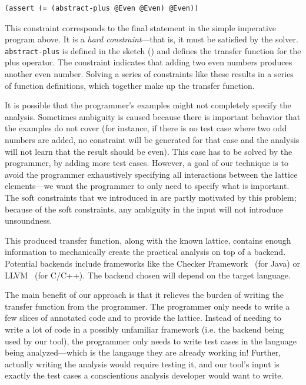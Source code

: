 \documentclass[10pt,conference]{IEEEtran}
\begin{document}
\lstset{language=[]Lisp}
\begin{lstlisting}[columns=fullflexible]
(assert (= (abstract-plus @Even @Even) @Even))
\end{lstlisting}
\lstset{language=C}

This constraint corresponds to the final statement in the
simple imperative program above.
It is a \textit{hard constraint}---that is, it must be satisfied
by the solver.
\lstinline{abstract-plus} is defined in the sketch () and defines
the transfer function for the plus operator.
The constraint indicates that
adding two even numbers produces another even number. Solving a series of
constraints like these
results in a series of function definitions, which together
make up the transfer function.

It is possible that the programmer's
examples might not completely specify the analysis. Sometimes
ambiguity is caused because there is important behavior that the
examples do not cover (for instance, if there is no test case where
two odd numbers are added, no constraint will be generated for that
case and the analysis will not learn that the result should be even).
This case has to be solved by the programmer, by adding more test cases.
However, a goal of our technique is to avoid the programmer exhaustively
specifying all interactions between the lattice elements---we want the
programmer to only need to specify what is important. The soft constraints
that we introduced in  are partly motivated by this problem;
because of the soft constraints, any ambiguity in the input will not
introduce unsoundness.

This produced transfer function, along with the known lattice,
contains enough information to mechanically create the practical
analysis on top of a backend. Potential backends include frameworks like the
Checker Framework~\cite{checker-framework} (for Java)
or LLVM~\cite{lattner04:_llvm} (for C/C++). The backend chosen will
depend on the target language.

The main benefit of our approach is that it relieves the burden of
writing the transfer function from the programmer. The programmer
only needs to write a few slices of annotated code and to provide
the lattice. Instead of
needing to write a lot of code in a possibly unfamiliar framework
(i.e. the backend being used by our tool), the programmer only needs to
write test cases in the language being analyzed---which is the langauge
they are already working in! Further, actually writing the analysis
would require testing it, and our tool's input is exactly the test
cases a conscientious analysis developer would want to write.
\end{document}
